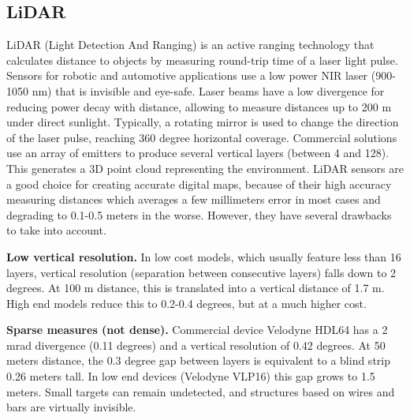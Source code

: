 

\subsection{LiDAR}
\label{sec:02-c-lidar}
LiDAR (Light Detection And Ranging) is an active ranging technology that 
calculates distance to objects by measuring round-trip time of a laser light 
pulse.
Sensors for robotic and automotive applications use a low power 
NIR laser (900-1050 nm) that is invisible and eye-safe. 
Laser beams have a low divergence for reducing power decay with distance,
allowing to measure distances up to 200 m under direct sunlight.
Typically, a rotating mirror is used to change the direction of the laser 
pulse, reaching 360 degree horizontal coverage. 
Commercial solutions use an array of 
emitters to produce several vertical layers (between 4 and 128). This generates
a 3D point cloud representing the environment.
LiDAR sensors are a good choice for creating accurate digital maps, because
of their high accuracy measuring distances which averages
a few millimeters error in most cases and degrading to 0.1-0.5 meters in the 
worse. %
However, they have several drawbacks to take into account.

    \textbf{Low vertical resolution.} In low cost models, which usually feature 
    less than 16 layers, vertical resolution (separation between consecutive
    layers) falls down to 2 degrees. At 100 m distance, this is translated into 
    a vertical distance of 1.7 m. High end models reduce this to 0.2-0.4 
    degrees, but at a much higher cost.
    
    \textbf{Sparse measures (not dense).} 
    Commercial device Velodyne HDL64 has a 2 mrad divergence \cite{Glennie2010} 
    (0.11 degrees) and a vertical resolution of 0.42 degrees. At 50 meters 
    distance, the 0.3 degree gap between layers is equivalent to a blind strip
    0.26 meters tall. In low end devices (Velodyne VLP16) this gap grows to 1.5
    meters. Small targets can remain undetected, and structures based on
    wires and bars are virtually invisible.
    

